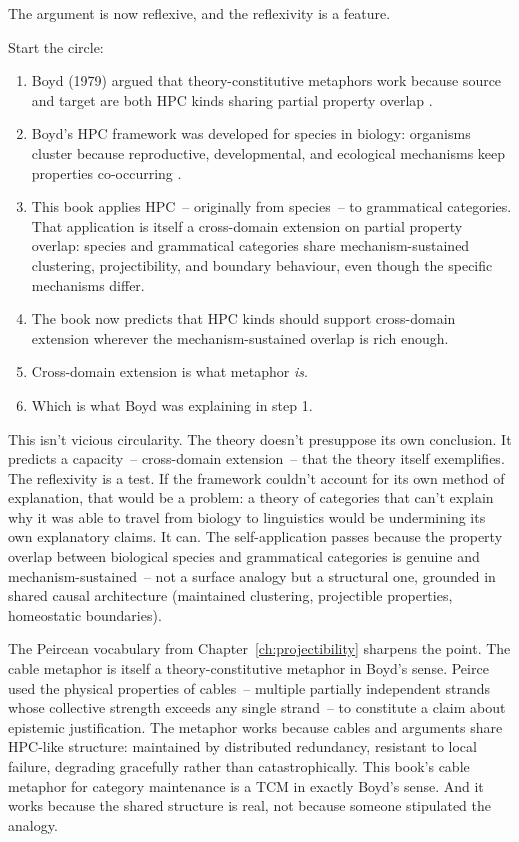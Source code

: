 The argument is now reflexive, and the reflexivity is a feature.

Start the circle:

\begin{enumerate}
\item Boyd (1979) argued that theory-constitutive metaphors work because source and target are both HPC kinds sharing partial property overlap \citep{boyd1979}.
\item Boyd's HPC framework was developed for species in biology: organisms cluster because reproductive, developmental, and ecological mechanisms keep properties co-occurring \citep{boyd1991}.
\item This book applies HPC~-- originally from species~-- to grammatical categories. That application is itself a cross-domain extension on partial property overlap: species and grammatical categories share mechanism-sustained clustering, projectibility, and boundary behaviour, even though the specific mechanisms differ.
\item The book now predicts that HPC kinds should support cross-domain extension wherever the mechanism-sustained overlap is rich enough.
\item Cross-domain extension is what metaphor \emph{is}.
\item Which is what Boyd was explaining in step 1.
\end{enumerate}

This isn't vicious circularity. The theory doesn't presuppose its own conclusion. It predicts a capacity~-- cross-domain extension~-- that the theory itself exemplifies. The reflexivity is a test. If the framework couldn't account for its own method of explanation, that would be a problem: a theory of categories that can't explain why it was able to travel from biology to linguistics would be undermining its own explanatory claims. It can. The self-application passes because the property overlap between biological species and grammatical categories is genuine and mechanism-sustained~-- not a surface analogy but a structural one, grounded in shared causal architecture (maintained clustering, projectible properties, homeostatic boundaries).

The Peircean vocabulary from Chapter~\ref{ch:projectibility} sharpens the point. The cable metaphor \citep[CP~5.265]{peirce1931cp} is itself a theory-constitutive metaphor in Boyd's sense. Peirce used the physical properties of cables~-- multiple partially independent strands whose collective strength exceeds any single strand~-- to constitute a claim about epistemic justification. The metaphor works because cables and arguments share HPC-like structure: maintained by distributed redundancy, resistant to local failure, degrading gracefully rather than catastrophically. This book's cable metaphor for category maintenance is a TCM in exactly Boyd's sense. And it works because the shared structure is real, not because someone stipulated the analogy.

